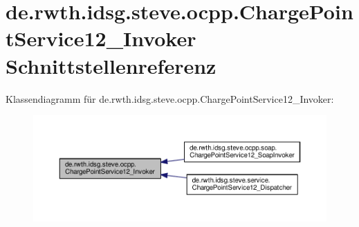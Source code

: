 \hypertarget{interfacede_1_1rwth_1_1idsg_1_1steve_1_1ocpp_1_1_charge_point_service12___invoker}{\section{de.\+rwth.\+idsg.\+steve.\+ocpp.\+Charge\+Point\+Service12\+\_\+\+Invoker Schnittstellenreferenz}
\label{interfacede_1_1rwth_1_1idsg_1_1steve_1_1ocpp_1_1_charge_point_service12___invoker}
}


Klassendiagramm für de.\+rwth.\+idsg.\+steve.\+ocpp.\+Charge\+Point\+Service12\+\_\+\+Invoker\+:\nopagebreak
\begin{figure}[H]
\begin{center}
\leavevmode
\includegraphics[width=350pt]{interfacede_1_1rwth_1_1idsg_1_1steve_1_1ocpp_1_1_charge_point_service12___invoker__inherit__graph}
\end{center}
\end{figure}

